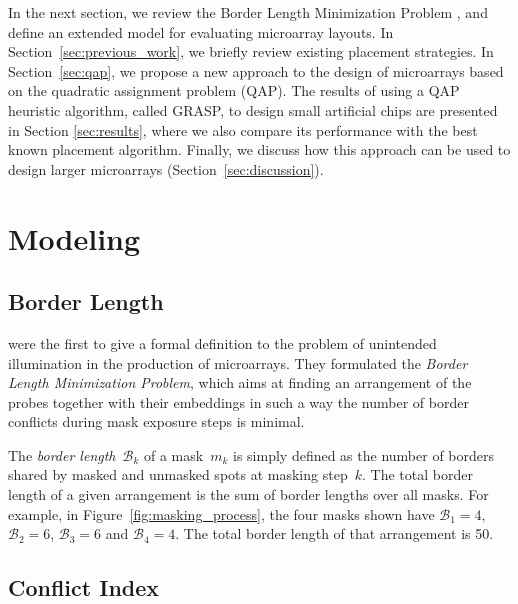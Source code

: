 \documentclass{bioinfo}
\begin{document}
In the next section, we review the Border Length Minimization Problem
\citep{HANNENHALLI02}, and define an extended model for evaluating microarray
layouts. In Section~\ref{sec:previous_work}, we briefly review existing
placement strategies. In Section~\ref{sec:qap}, we propose a new approach to
the design of microarrays based on the quadratic assignment problem (QAP). The
results of using a QAP heuristic algorithm, called GRASP, to design small
artificial chips are presented in Section \ref{sec:results}, where we also
compare its performance with the best known placement algorithm. Finally, we
discuss how this approach can be used to design larger microarrays
(Section~\ref{sec:discussion}).

\section{Modeling}
\label{sec:model}

\subsection{Border Length}

\citet{HANNENHALLI02} were the first to give a formal definition to the problem of unintended illumination in the production of microarrays. They formulated the \emph{Border Length Minimization Problem}, which aims at finding an arrangement of the probes together with their embeddings in such a way the number of border conflicts during mask exposure steps is minimal.

The \emph{border length}~$\mathcal{B}_k$ of a mask~$m_{k}$ is simply
defined as the number of borders shared by masked and unmasked spots
at masking step~$k$. The total border length of a given arrangement is
the sum of border lengths over all masks. For example, in
Figure~\ref{fig:masking_process}, the four masks shown have $\mathcal{B}_1 = 4$, $\mathcal{B}_2 = 6$, $\mathcal{B}_3 = 6$ and $\mathcal{B}_4 = 4$. The total border length of that arrangement is 50.

\subsection{Conflict Index}
\end{document}

